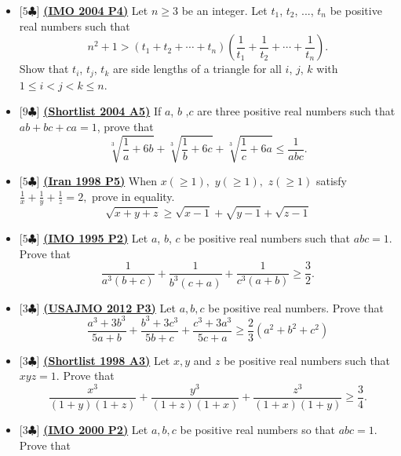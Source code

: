 \documentclass[12pt]{article}
\begin{document}
\begin{itemize}
	\item [\texttt{\textcolor{color6}{04IMO4}}] \textcolor{color6}{[$5\clubsuit$]} \href{https://artofproblemsolving.com/community/p99756}{\textbf{(IMO 2004 P4)}} Let $n \geq 3$ be an integer. Let $t_1$, $t_2$, ..., $t_n$ be positive real numbers such that\[n^2 + 1 > \left( t_1 + t_2 + \cdots + t_n \right) \left( \frac{1}{t_1} + \frac{1}{t_2} + \cdots + \frac{1}{t_n} \right).\]Show that $t_i$, $t_j$, $t_k$ are side lengths of a triangle for all $i$, $j$, $k$ with $1 \leq i < j < k \leq n$.
	\item [\texttt{\textcolor{color3}{04SLA5}}] \textcolor{color3}{[$9\clubsuit$]} \href{https://artofproblemsolving.com/community/c6h30865p191113}{\textbf{(Shortlist 2004 A5)}} If $a$, $b$ ,$c$ are three positive real numbers such that $ab+bc+ca = 1$, prove that\[ \sqrt[3]{ \frac{1}{a} + 6b} + \sqrt[3]{\frac{1}{b} + 6c} + \sqrt[3]{\frac{1}{c} + 6a } \leq \frac{1}{abc}.  \]
	\item [\texttt{\textcolor{color3}{98IRN}}] \textcolor{color3}{[$5\clubsuit$]} \href{https://artofproblemsolving.com/community/c6h1100451p4954922}{\textbf{(Iran 1998 P5)}} When $x(\ge1),$ $y(\ge1),$ $z(\ge1)$ satisfy $\frac{1}{x}+\frac{1}{y}+\frac{1}{z}=2,$ prove in equality.
	      $$\sqrt{x+y+z}\ge\sqrt{x-1}+\sqrt{y-1}+\sqrt{z-1}$$
	\item [\texttt{\textcolor{color3}{95IMO2}}] \textcolor{color3}{[$5\clubsuit$]} \href{https://artofproblemsolving.com/community/c6h60434p365178}{\textbf{(IMO 1995 P2)}} Let $ a$, $ b$, $ c$ be positive real numbers such that $ abc = 1$. Prove that
	      \[ \frac {1}{a^{3}\left(b + c\right)} + \frac {1}{b^{3}\left(c + a\right)} + \frac {1}{c^{3}\left(a + b\right)}\geq \frac {3}{2}.
	      \]
	\item [\texttt{\textcolor{color3}{12JMO3}}] \textcolor{color3}{[$3\clubsuit$]} \href{https://artofproblemsolving.com/community/p2669114}{\textbf{(USAJMO 2012 P3)}} Let $a,b,c$ be positive real numbers. Prove that
	      \[
		      \frac{a^3+3b^3}{5a+b}+\frac{b^3+3c^3}{5b+c}+\frac{c^3+3a^3}{5c+a} \geq \frac{2}{3}(a^2+b^2+c^2)
	      \]
	\item [\texttt{\textcolor{color3}{98SLA3}}] \textcolor{color3}{[$3\clubsuit$]} \href{https://artofproblemsolving.com/community/c6h18488p124421}{\textbf{(Shortlist 1998 A3)}} Let $x,y$ and $z$ be positive real numbers such that $xyz=1$. Prove that
	      \[
		      \frac{x^{3}}{(1 + y)(1 + z)}+\frac{y^{3}}{(1 + z)(1 + x)}+\frac{z^{3}}{(1 + x)(1 + y)}
		      \geq \frac{3}{4}.
	      \]
	\item [\texttt{\textcolor{color3}{00IMO2}}] \textcolor{color3}{[$3\clubsuit$]} \href{https://artofproblemsolving.com/community/c6h57603p354109}{\textbf{(IMO 2000 P2)}} Let $ a, b, c$ be positive real numbers so that $ abc = 1$. Prove that

\end{itemize}
\end{document}

